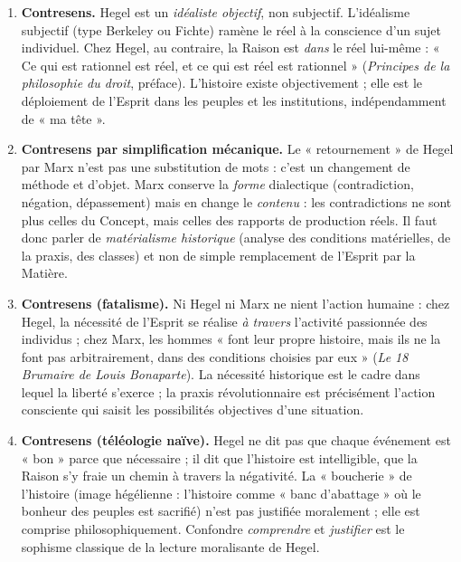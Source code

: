\documentclass[11pt]{article}
\begin{document}
\begin{corrige}
\begin{enumerate}
\item \textbf{Contresens.} Hegel est un \emph{idéaliste objectif}, non subjectif. L'idéalisme subjectif (type Berkeley ou Fichte) ramène le réel à la conscience d'un sujet individuel. Chez Hegel, au contraire, la Raison est \emph{dans} le réel lui-même : « Ce qui est rationnel est réel, et ce qui est réel est rationnel » (\emph{Principes de la philosophie du droit}, préface). L'histoire existe objectivement ; elle est le déploiement de l'Esprit dans les peuples et les institutions, indépendamment de « ma tête ».
\item \textbf{Contresens par simplification mécanique.} Le « retournement » de Hegel par Marx n'est pas une substitution de mots : c'est un changement de méthode et d'objet. Marx conserve la \emph{forme} dialectique (contradiction, négation, dépassement) mais en change le \emph{contenu} : les contradictions ne sont plus celles du Concept, mais celles des rapports de production réels. Il faut donc parler de \emph{matérialisme historique} (analyse des conditions matérielles, de la praxis, des classes) et non de simple remplacement de l'Esprit par la Matière.
\item \textbf{Contresens (fatalisme).} Ni Hegel ni Marx ne nient l'action humaine : chez Hegel, la nécessité de l'Esprit se réalise \emph{à travers} l'activité passionnée des individus ; chez Marx, les hommes « font leur propre histoire, mais ils ne la font pas arbitrairement, dans des conditions choisies par eux » (\emph{Le 18 Brumaire de Louis Bonaparte}). La nécessité historique est le cadre dans lequel la liberté s'exerce ; la praxis révolutionnaire est précisément l'action consciente qui saisit les possibilités objectives d'une situation.
\item \textbf{Contresens (téléologie naïve).} Hegel ne dit pas que chaque événement est « bon » parce que nécessaire ; il dit que l'histoire est intelligible, que la Raison s'y fraie un chemin à travers la négativité. La « boucherie » de l'histoire (image hégélienne : l'histoire comme « banc d'abattage » où le bonheur des peuples est sacrifié) n'est pas justifiée moralement ; elle est comprise philosophiquement. Confondre \emph{comprendre} et \emph{justifier} est le sophisme classique de la lecture moralisante de Hegel.
\end{enumerate}
\end{corrige}
\end{document}
